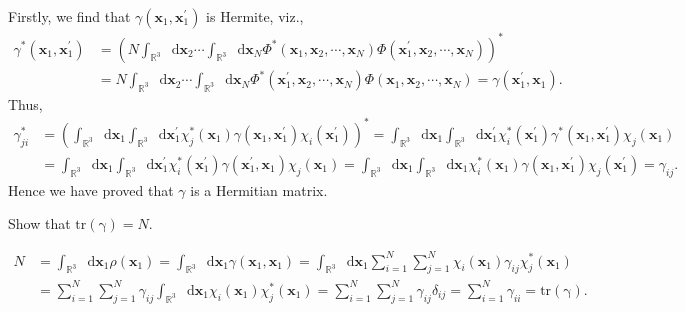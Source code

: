 \documentclass[a4paper]{book}
\newcommand\tr[1]{\mathrm{tr(#1)}}
\newcommand*{\dif}{\mathop{}\!\mathrm{d}}
\begin{document}
	\begin{solution}
	Firstly, we find that $\gamma( \boldsymbol{x}_1 , \boldsymbol{x}^\prime_1 )$ is Hermite, viz.,
	\begin{align*}
		\gamma^*( \boldsymbol{x}_1 , \boldsymbol{x}^\prime_1 ) &= \left( N \int_{\mathbb{R}^3} \dif \boldsymbol{x}_2 \cdots \int_{\mathbb{R}^3} \dif \boldsymbol{x}_N \Phi^*( \boldsymbol{x}_1 , \boldsymbol{x}_2 , \cdots , \boldsymbol{x}_N ) \Phi( \boldsymbol{x}^\prime_1 , \boldsymbol{x}_2 , \cdots , \boldsymbol{x}_N ) \right)^* \\
		&= N \int_{\mathbb{R}^3} \dif \boldsymbol{x}_2 \cdots \int_{\mathbb{R}^3} \dif \boldsymbol{x}_N \Phi^*( \boldsymbol{x}^\prime_1 , \boldsymbol{x}_2 , \cdots , \boldsymbol{x}_N ) \Phi( \boldsymbol{x}_1 , \boldsymbol{x}_2 , \cdots , \boldsymbol{x}_N ) = \gamma( \boldsymbol{x}^\prime_1 , \boldsymbol{x}_1 ).
	\end{align*}
	Thus,
	\begin{align*}
		\gamma^*_{ji} &= \left( \int_{\mathbb{R}^3} \dif \boldsymbol{x}_1 \int_{\mathbb{R}^3} \dif \boldsymbol{x}^\prime_1 \chi^*_j( \boldsymbol{x}_1 ) \gamma( \boldsymbol{x}_1 , \boldsymbol{x}^\prime_1 ) \chi_i( \boldsymbol{x}^\prime_1 ) \right)^* = \int_{\mathbb{R}^3} \dif \boldsymbol{x}_1 \int_{\mathbb{R}^3} \dif \boldsymbol{x}^\prime_1 \chi^*_i( \boldsymbol{x}^\prime_1 ) \gamma^*( \boldsymbol{x}_1 , \boldsymbol{x}^\prime_1 ) \chi_j( \boldsymbol{x}_1 ) \\
		&= \int_{\mathbb{R}^3} \dif \boldsymbol{x}_1 \int_{\mathbb{R}^3} \dif \boldsymbol{x}^\prime_1 \chi^*_i( \boldsymbol{x}^\prime_1 ) \gamma( \boldsymbol{x}^\prime_1 , \boldsymbol{x}_1 ) \chi_j( \boldsymbol{x}_1 ) = \int_{\mathbb{R}^3} \dif \boldsymbol{x}_1 \int_{\mathbb{R}^3} \dif \boldsymbol{x}_1 \chi^*_i( \boldsymbol{x}_1 ) \gamma( \boldsymbol{x}_1 , \boldsymbol{x}^\prime_1 ) \chi_j( \boldsymbol{x}^\prime_1 ) = \gamma_{ij}.
	\end{align*}
	Hence we have proved that $\gamma$ is a Hermitian matrix.
	
	\end{solution}	
	
	\begin{exercise}
	Show that $\tr{\gamma}=N$.
	\end{exercise}
	
	\begin{solution}
	
	\begin{align*}
		N &= \int_{ \mathbb{R}^3 } \dif \boldsymbol{x}_1 \rho( \boldsymbol{x}_1 ) = \int_{ \mathbb{R}^3 } \dif \boldsymbol{x}_1 \gamma( \boldsymbol{x}_1 , \boldsymbol{x}_1  ) = \int_{ \mathbb{R}^3 } \dif \boldsymbol{x}_1 \sum_{ i=1 }^N \sum_{ j=1 }^N \chi_i( \boldsymbol{x}_1 ) \gamma_{ij} \chi^*_j( \boldsymbol{x}_1 ) \\
		&= \sum_{ i=1 }^N \sum_{ j=1 }^N \gamma_{ij} \int_{ \mathbb{R}^3 } \dif \boldsymbol{x}_1 \chi_i( \boldsymbol{x}_1 )  \chi^*_j( \boldsymbol{x}_1 ) = \sum_{ i=1 }^N \sum_{ j=1 }^N \gamma_{ij} \delta_{ij} = \sum_{ i=1 }^N \gamma_{ii} = \tr\gamma.
	\end{align*}
	
	\end{solution}
	
\end{document}
